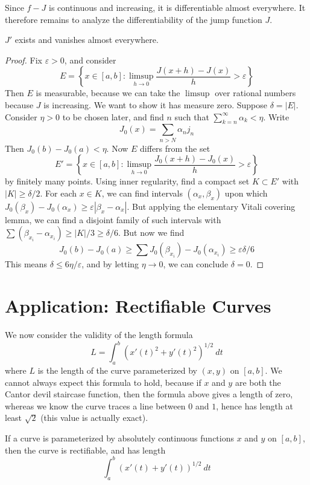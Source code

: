 Since $f - J$ is continuous and increasing, it is differentiable almost everywhere. It therefore remains to analyze the differentiability of the jump function $J$.

\begin{theorem}
    $J'$ exists and vanishes almost everywhere.
\end{theorem}
\begin{proof}
    Fix $\varepsilon > 0$, and consider
    \[ E = \left\{ x \in [a,b]: \limsup_{h \to 0} \frac{J(x + h) - J(x)}{h} > \varepsilon \right\} \]
    Then $E$ is measurable, because we can take the $\limsup$ over rational numbers because $J$ is increasing. We want to show it has measure zero. Suppose $\delta = |E|$. Consider $\eta > 0$ to be chosen later, and find $n$ such that $\sum_{k = n}^\infty \alpha_k < \eta$. Write
    \[ J_0(x) = \sum_{n > N} \alpha_n j_n \]
    Then $J_0(b) - J_0(a) < \eta$. Now $E$ differs from the set
    \[ E' = \left\{ x \in [a,b]: \limsup_{h \to 0} \frac{J_0(x + h) - J_0(x)}{h} > \varepsilon \right\} \]
    by finitely many points. Using inner regularity, find a compact set $K \subset E'$ with $|K| \geq \delta/2$. For each $x \in K$, we can find intervals $(\alpha_x, \beta_x)$ upon which $J_0(\beta_x) - J_0(\alpha_x) \geq \varepsilon |\beta_x - \alpha_x|$. But applying the elementary Vitali covering lemma, we can find a disjoint family of such intervals with $\sum (\beta_{x_i} - \alpha_{x_i}) \geq |K|/3 \geq \delta/6$. But now we find
    \[ J_0(b) - J_0(a) \geq \sum J_0(\beta_{x_i}) - J_0(\alpha_{x_i}) \geq \varepsilon \delta/6 \]
    This means $\delta \leq 6 \eta/\varepsilon$, and by letting $\eta \to 0$, we can conclude $\delta = 0$.
\end{proof}

\section{Application: Rectifiable Curves}

We now consider the validity of the length formula
%
\[ L = \int_a^b (x'(t)^2 + y'(t)^2)^{1/2}\ dt \]
%
where $L$ is the length of the curve parameterized by $(x,y)$ on $[a,b]$. We cannot always expect this formula to hold, because if $x$ and $y$ are both the Cantor devil staircase function, then the formula above gives a length of zero, whereas we know the curve traces a line between $0$ and $1$, hence has length at least $\sqrt{2}$ (this value is actually exact).

\begin{theorem}
    If a curve is parameterized by absolutely continuous functions $x$ and $y$ on $[a,b]$, then the curve is rectifiable, and has length
    \[ \int_a^b (x'(t) + y'(t))^{1/2}\ dt \]
\end{theorem}

